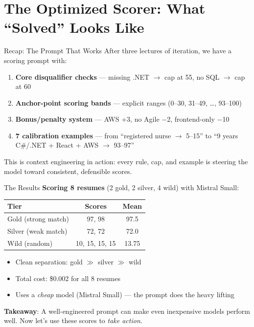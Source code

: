 \documentclass[aspectratio=169]{beamer}
\begin{document}
\section{The Optimized Scorer: What ``Solved'' Looks Like}

\begin{frame}{Recap: The Prompt That Works}
After three lectures of iteration, we have a scoring prompt with:
\vspace{0.2cm}
\begin{enumerate}
    \item \textbf{Core disqualifier checks} --- missing .NET $\rightarrow$ cap at 55, no SQL $\rightarrow$ cap at 60
    \item \textbf{Anchor-point scoring bands} --- explicit ranges (0--30, 31--49, \ldots, 93--100)
    \item \textbf{Bonus/penalty system} --- AWS +3, no Agile $-$2, frontend-only $-$10
    \item \textbf{7 calibration examples} --- from ``registered nurse $\rightarrow$ 5--15'' to ``9 years C\#/.NET + React + AWS $\rightarrow$ 93--97''
\end{enumerate}
\vspace{0.3cm}

This is context engineering in action: every rule, cap, and example is steering the model toward consistent, defensible scores.
\end{frame}

\begin{frame}{The Results}
\textbf{Scoring 8 resumes} (2 gold, 2 silver, 4 wild) with Mistral Small:
\vspace{0.3cm}

\begin{center}
\begin{tabular}{lcc}
\textbf{Tier} & \textbf{Scores} & \textbf{Mean} \\
\hline
Gold (strong match) & 97, 98 & 97.5 \\
Silver (weak match) & 72, 72 & 72.0 \\
Wild (random) & 10, 15, 15, 15 & 13.75 \\
\end{tabular}
\end{center}
\vspace{0.3cm}

\begin{itemize}
    \item Clean separation: gold $\gg$ silver $\gg$ wild
    \item Total cost: \$0.002 for all 8 resumes
    \item Uses a \textit{cheap} model (Mistral Small) --- the prompt does the heavy lifting
\end{itemize}
\vspace{0.3cm}

\textbf{Takeaway}: A well-engineered prompt can make even inexpensive models perform well. Now let's use these scores to \textit{take action}.
\end{frame}
\end{document}
